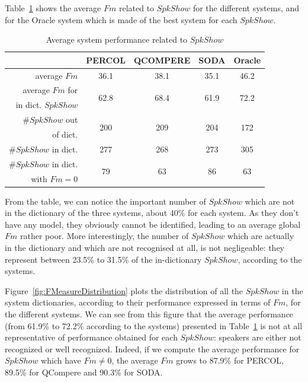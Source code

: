

Table~\ref{table-spkshow-perf} shows the average $Fm$ related to $SpkShow$ for the different systems, and for the Oracle system which is made of the best system for each $SpkShow$.
\begin{table}[t]
\begin{center}
\footnotesize
\begin{tabular}{r||c|c|c|c}
						& PERCOL 				&	 QCOMPERE 			& SODA 					& Oracle 				\\
\hline\hline
average $Fm$ 			& 36.1 	 				& 38.1 					& 35.1 					& 46.2	 				\\
\hline
average $Fm$ for 		& \multirow{2}{*}{62.8}	& \multirow{2}{*}{68.4}	& \multirow{2}{*}{61.9}	& \multirow{2}{*}{72.2}	\\
in dict. $SpkShow$ 		&  						&  						&  						& 						\\
\hline
\#$SpkShow$ out 			& \multirow{2}{*}{200}	& \multirow{2}{*}{209}	& \multirow{2}{*}{204}	& \multirow{2}{*}{172}	\\
of dict. 				& 	 					& 	 					& 	 					& 						\\
\hline
\#$SpkShow$ in dict. 	& 277					& 268 					& 273 					& 305					\\
\hline
\#$SpkShow$ in dict. 	& \multirow{2}{*}{79}	& \multirow{2}{*}{63}	& \multirow{2}{*}{86} 	& \multirow{2}{*}{63}	\\
with $Fm=0$ 				& 	 					& 	 					& 	 					& 						\\
\hline
\end{tabular}
\caption{Average system performance related to $SpkShow$}
\label{table-spkshow-perf}
\end{center}
\end{table}

From the table, we can notice the important number of $SpkShow$ which are not in the dictionary of the three systems, about 40\% for each system. As they don't have any model, they obviously cannot be identified, leading to an average global $Fm$ rather poor. More interestingly, the number of $SpkShow$ which are actually in the dictionary and which are not recognised at all, is not negligeable: they represent between 23.5\% to 31.5\% of the in-dictionary $SpkShow$, according to the systems.


Figure~\ref{fig:FMeasureDistribution} plots the distribution of all the $SpkShow$ in the system dictionaries, according to their performance expressed in terms of $Fm$, for the different systems. We can see from this figure that the average performance (from 61.9\% to 72.2\% according to the systems) presented in Table~\ref{table-spkshow-perf} is not at all representative of performance obtained for each $SpkShow$: speakers are either not recognized or well recognized. Indeed, if we compute the average performance for $SpkShow$ which have $Fm \neq 0$, the average $Fm$ grows to 87.9\% for PERCOL, 89.5\% for QCompere and 90.3\% for SODA. 

